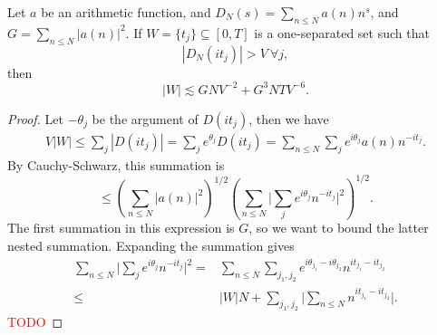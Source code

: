 \begin{lemma}
    \label{halasz}
    Let $a$ be an arithmetic function, and $D_N(s)=\sum_{n\leq N}a(n)n^{s}$, and $G=\sum_{n\leq N} |a(n)|^2.$
    If $W = \{t_j\}\subseteq [0,T]$ is a one-separated set such that \[
        |D_N(it_j)| > V \ \forall j,
    \]
    then 
    \[
        |W|\lesssim GNV^{-2} + G^3NTV^{-6}.
        \]
\end{lemma}
\begin{proof}
    Let $-\theta_j$ be the argument of $D(it_j)$, then we have \begin{align*}
        V|W|\leq \sum_j |D(it_j)| = \sum_j e^{\theta_j}D(it_j ) = \sum_{n\leq N} \sum_j e^{i\theta_j} a(n) n^{-it_j}.
    \end{align*}
    By Cauchy-Schwarz, this summation is \[
    \leq \left(\sum_{n\leq N} |a(n)|^2 \right)^{1/2}\left(\sum_{n\leq N} \bigg|\sum_j e^{i\theta_j} n^{-it_j}\bigg|^2 \right)^{1/2}.
    \]
    The first summation in this expression is $G$, so we want to bound the latter nested summation.
    Expanding the summation gives \begin{align*}
        \sum_{n\leq N} \bigg|\sum_j e^{i\theta_j} n^{-it_j}\bigg|^2 =& 
        \sum_{n\leq N} \sum_{j_1,j_2} e^{i\theta_{j_1}-i\theta_{j_2}} n^{it_{j_1}-it_{j_2}}\\
        \leq & |W|N + \sum_{j_1,j_2} \bigg|\sum_{n\leq N}  n^{it_{j_1}-it_{j_2}}\bigg|.
    \end{align*}
    \textcolor{red}{TODO}
\end{proof}

